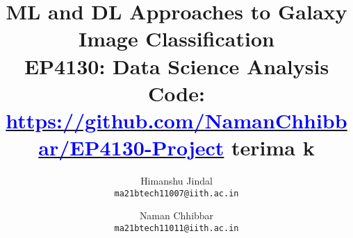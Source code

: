 \documentclass[10pt, twocolumn, letterpaper]{article}
\title{
ML and DL Approaches to Galaxy Image Classification \\
\large{\normalfont EP4130: Data Science Analysis} \\
\normalfont Code: {\href{https://github.com/NamanChhibbar/EP4130-Project}{\textcolor {blue}{\normalfont https://github.com/NamanChhibbar/EP4130-Project}}}
terima k}
\author{
    Himanshu Jindal \\
    {\tt\small ma21btech11007@iith.ac.in}
    \and
    Naman Chhibbar \\
    {\tt\small ma21btech11011@iith.ac.in}
}
\begin{document}
\maketitle
   









{
    \small
    \nocite{*}
    
}

% 
\end{document}

